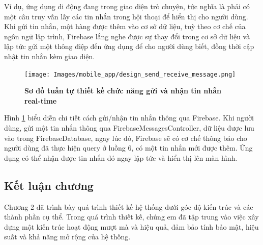 Ví dụ, ứng dụng di động đang trong giao diện trò chuyện, tức nghĩa là phải có một câu truy vấn lấy các tin nhắn trong hội thoại
để hiển thị cho người dùng. Khi gửi tin nhắn, một hàng được thêm vào
cơ sở dữ liệu, tuỳ theo cơ chế của ngôn ngữ lập trình, Firebase lắng nghe được sự thay đổi
trong cơ sở dữ liệu và lập tức gửi một thông điệp đến ứng dụng để cho người dùng biết, đồng thời cập nhật tin nhắn kèm giao diện.

\begin{figure}[H]
  \centering
  \texttt{[image: Images/mobile\_app/design\_send\_receive\_message.png]}
  \caption[Sơ đồ tuần tự thiết kế chức năng gửi và nhận tin nhắn real-time]{\bfseries \fontsize{12pt}{0pt}
  \selectfont Sơ đồ tuần tự thiết kế chức năng gửi và nhận tin nhắn real-time}
  \label{design_send_receive_firebase_message} %
\end{figure}

Hình \ref{design_send_receive_firebase_message} biểu diễn chi tiết cách gửi/nhận tin nhắn thông qua Firebase. Khi người dùng,
gửi một tin nhắn thông qua FirebaseMessagesController, dữ liệu được lưu vào trong FirebaseDatabase, ngay lúc đó, Firebase sẽ có
cơ chế thông báo cho người dùng đã thực hiện query ở luồng 6, có một tin nhắn mới được thêm. Ứng dụng có thể nhận được tin nhắn
đó ngay lập tức và hiển thị lên màn hình.

\subsection{Kết luận chương}

Chương 2 đã trình bày quá trình thiết kế hệ thống 
dưới góc độ kiến trúc và các thành
 phần cụ thể. Trong quá trình thiết kế, chúng em đã tập trung
  vào việc xây dựng một kiến trúc hoạt động mượt mà và hiệu quả,
   đảm bảo tính bảo mật, hiệu suất và khả năng mở rộng của hệ
    thống.

\newpage